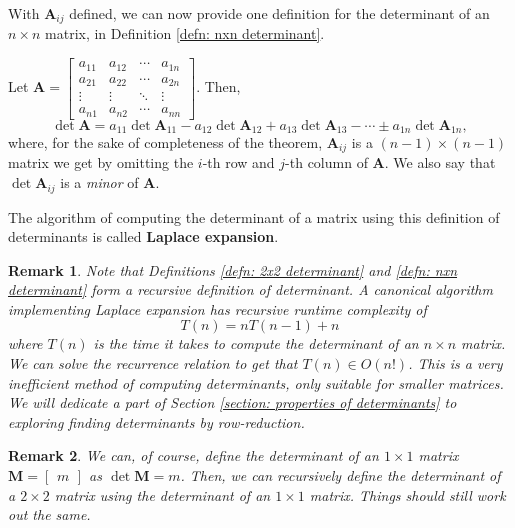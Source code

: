 \documentclass[]{book}
\newcommand{\mat}[1]{\ensuremath{\mathbf{#1}}}
\newcommand{\elemmatnn}[1][a]{\ensuremath{\begin{bmatrix}
{#1}_{11} & {#1}_{12} & \cdots & {#1}_{1n} \\
{#1}_{21} & {#1}_{22} & \cdots & {#1}_{2n} \\
\vdots    & \vdots    & \ddots & \vdots    \\
{#1}_{n1} & {#1}_{n2} & \cdots & {#1}_{nn}
\end{bmatrix}}}
\newtheorem*{remark}{Remark}
\begin{document}
With $\mat{A}_{ij}$ defined, we can now provide one definition for the determinant of an $n \times n$ matrix, in Definition \ref{defn: nxn determinant}.

\begin{definition}
    \label{defn: laplace expansion}
    \label{defn: nxn determinant}
    Let $\mat{A} = \elemmatnn$. Then,
    \[\det\mat{A} = a_{11}\det\mat{A}_{11} - a_{12}\det\mat{A}_{12} + a_{13}\det\mat{A}_{13} - \cdots \pm a_{1n}\det\mat{A}_{1n},\]
    where, for the sake of completeness of the theorem, $\mat{A}_{ij}$ is a $(n-1) \times (n-1)$ matrix we get by omitting the $i$-th row and $j$-th column of $\mat{A}$. We also say that $\det\mat{A}_{ij}$ is a \emph{minor} of $\mat{A}$.
    
    The algorithm of computing the determinant of a matrix using this definition of determinants is called \textbf{Laplace expansion}.
\end{definition}

\begin{remark}
    Note that Definitions \ref{defn: 2x2 determinant} and \ref{defn: nxn determinant} form a \textit{recursive} definition of determinant. A canonical algorithm implementing Laplace expansion has recursive runtime complexity of
    \[T(n) = nT(n-1) + n\] where $T(n)$ is the time it takes to compute the determinant of an $n \times n$ matrix. We can solve the recurrence relation to get that $T(n) \in O(n!)$. This is a very inefficient method of computing determinants, only suitable for smaller matrices. We will dedicate a part of Section \ref{section: properties of determinants} to exploring finding determinants by row-reduction.
\end{remark}

\begin{remark}
    We can, of course, define the determinant of an $1 \times 1$ matrix $\mat{M}=\begin{bmatrix}m\end{bmatrix}$ as $\det\mat{M}=m$. Then, we can recursively define the determinant of a $2 \times 2$ matrix using the determinant of an $1 \times 1$ matrix. Things should still work out the same.
\end{remark}
\end{document}

